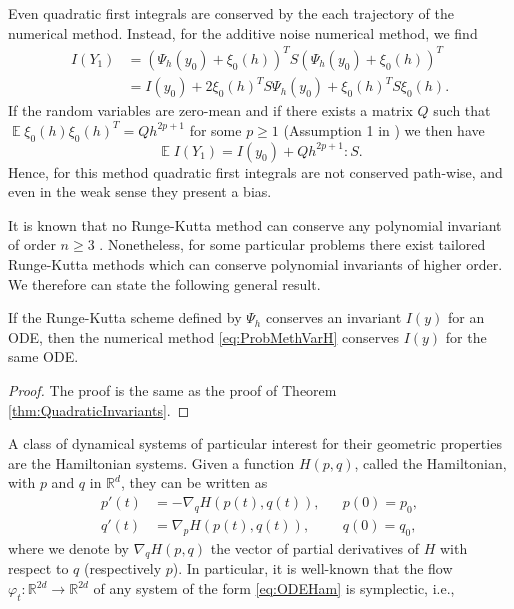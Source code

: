 \documentclass{siamart1116}
\numberwithin{theorem}{section}
\renewcommand{\phi}{\varphi}
\newcommand{\R}{\mathbb{R}}
\newcommand{\E}{\operatorname{\mathbb{E}}}
\begin{document}
\begin{remark}\label{rem:QuadraticInvariants} Even quadratic first integrals are conserved by the each trajectory of the numerical method. Instead, for the additive noise numerical method, we find
	\begin{equation}
	\begin{aligned}
		I(Y_1) &= (\Psi_h(y_0) + \xi_0(h))^T S (\Psi_h(y_0) + \xi_0(h))^T \\
		&= I(y_0) + 2\xi_0(h)^T S  \Psi_h(y_0) + \xi_0(h)^T S \xi_0(h).
	\end{aligned}
	\end{equation}
	If the random variables are zero-mean and if there exists a matrix $Q$ such that $\E\xi_0(h)\xi_0(h)^T = Qh^{2p + 1}$ for some $p \geq 1$ (Assumption 1 in \cite{CGS16}) we then have
	\begin{equation}
		\E I(Y_1) = I(y_0) + Q h^{2p + 1} : S.
	\end{equation}
	Hence, for this method quadratic first integrals are not conserved path-wise, and even in the weak sense they present a bias.
\end{remark}
It is known that no Runge-Kutta method can conserve any polynomial invariant of order $n \geq 3$ \cite{HLW06}. Nonetheless, for some particular problems there exist tailored Runge-Kutta methods which can conserve polynomial invariants of higher order. We therefore can state the following general result.
\begin{theorem}\label{thm:PolyInvariants} If the Runge-Kutta scheme defined by $\Psi_h$ conserves an invariant $I(y)$ for an ODE, then the numerical method \eqref{eq:ProbMethVarH} conserves $I(y)$ for the same ODE.
\end{theorem}
\begin{proof} The proof is the same as the proof of Theorem \ref{thm:QuadraticInvariants}.
\end{proof}
A class of dynamical systems of particular interest for their geometric properties are the Hamiltonian systems. Given a function $H(p, q)$, called the Hamiltonian, with $p$ and $q$ in $\R^d$, they can be written as
\begin{equation}\label{eq:ODEHam}
\begin{aligned}
	p'(t) &= -\nabla_q H(p(t), q(t)), && p(0) = p_0,\\
	q'(t) &= \nabla_p H(p(t), q(t)), && q(0) = q_0,
\end{aligned}
\end{equation}
where we denote by $\nabla_q H(p, q)$ the vector of partial derivatives of $H$ with respect to $q$ (respectively $p$). In particular, it is well-known that the flow $\phi_t\colon\R^{2d}\to\R^{2d}$ of any system of the form \eqref{eq:ODEHam} is symplectic, i.e., 
\end{document}
